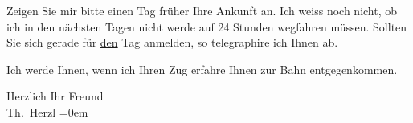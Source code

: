 \pstart
           Zeigen Sie mir bitte einen Tag früher Ihre Ankunft an. Ich weiss noch nicht, ob ich
               in den nächsten Tagen nicht werde auf 24 Stunden wegfahren müssen. Sollten Sie sich
               gerade für \uline{den} Tag anmelden, so telegraphire ich
               Ihnen ab.\pend
           
\pstart
           Ich werde Ihnen, wenn ich Ihren Zug erfahre Ihnen zur Bahn entgegenkommen.\pend
           
\pstart
           Herzlich Ihr Freund{\\[\baselineskip]}\spacefill\mbox{Th. Herzl}\pend
           \leftskip=0em{}\endnumbering{}
\begin{anhang}
\end{anhang}\newcommand{\dateiname}{L03894}\newcommand{\titel}{Theodor Herzl an Arthur Schnitzler, [zwischen 28. 7.  und 5. 8. 1895?]}\newcommand{\editorInnen}{Selma Jahnke und Martin Anton Müller}
